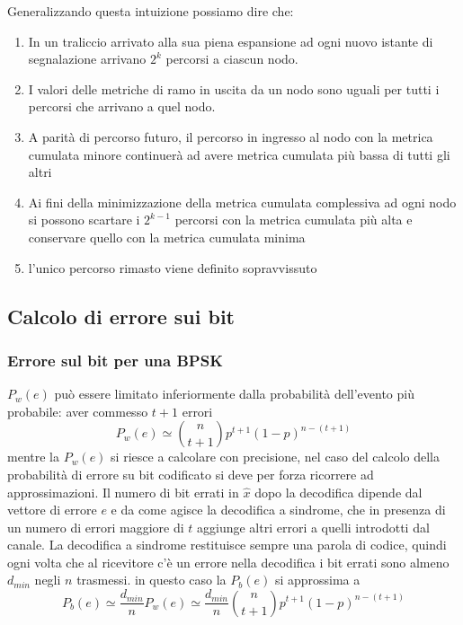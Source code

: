         Generalizzando questa intuizione possiamo dire che:
        \begin{enumerate}
            \item {In un traliccio arrivato alla sua piena espansione ad ogni nuovo istante di segnalazione arrivano $2^k$ percorsi a ciascun nodo.}
            \item {I valori delle metriche di ramo in uscita da un nodo sono uguali per tutti i percorsi che arrivano a quel nodo.}
            \item {A parità di percorso futuro, il percorso in ingresso al nodo con la metrica cumulata minore continuerà ad avere metrica cumulata più bassa di tutti gli altri}
            \item {Ai fini della minimizzazione della metrica cumulata complessiva ad ogni nodo si possono scartare i $2^{k-1}$ percorsi con la metrica cumulata 
                più alta e conservare quello con la metrica cumulata minima
            }
            \item {l'unico percorso rimasto viene definito sopravvissuto}
        \end{enumerate}
    \subsection{Calcolo di errore sui bit}
        \subsubsection{Errore sul bit per una BPSK}
            $P_w(e)$ può essere limitato inferiormente dalla probabilità dell'evento più probabile: aver commesso $t+1$
            errori
            \[
                P_w(e) \simeq \binom{n}{t+1}p^{t+1}(1-p)^{n-(t+1)}
            \]
            mentre la $P_w(e)$ si riesce a calcolare con precisione, nel caso del calcolo della probabilità di errore 
            su bit codificato si deve per forza ricorrere ad approssimazioni. Il numero di bit errati in $\hat{x}$ dopo la 
            decodifica dipende dal vettore di errore $e$ e da come agisce la decodifica a sindrome, che in presenza di un numero 
            di errori maggiore di $t$ aggiunge altri errori a quelli introdotti dal canale. La decodifica a sindrome restituisce
            sempre una parola di codice, quindi ogni volta che al ricevitore c'è un errore nella decodifica i bit errati sono almeno
            $d_{min}$ negli $n$ trasmessi. in questo caso la $P_b(e)$ si approssima a
            \[
                P_b(e) \simeq\frac{d_{min}}{n}P_w(e)\simeq\frac{d_{min}}{n}\binom{n}{t+1}p^{t+1}(1-p)^{n-(t+1)}  
            \] 
